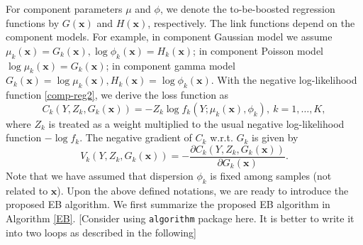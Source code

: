 \documentclass[11pt]{article}
\numberwithin{equation}{section}
\def\bx{\boldsymbol{x}}
\newcommand{\blue}[1]{\textcolor{blue}{#1}}
\begin{document}
For component parameters $\mu$ and $\phi$,  we denote the to-be-boosted regression functions by $G(\bx)$ and $H(\bx)$, respectively. 
The link functions depend on the component models.  For example, in component Gaussian model we assume $\mu_k(\bx)=G_k(\bx), \log \phi_k(\bx)=H_k(\bx)$; in component Poisson model $\log\mu_k(\bx)=G_k(\bx)$; in component gamma model $G_k(\bx)=\log \mu_k(\bx), H_k(\bx)=\log \phi_k(\bx).$
With the negative log-likelihood function \eqref{comp-reg2}, we derive the loss function as
	\begin{equation}\label{comp-loss}
		{C_k(Y,Z_k,G_k(\bx))}= -Z_k\log f_k(Y;\mu_k(\bx),\phi_k), ~ k=1,\ldots,K,
	\end{equation}
where $Z_k$ is treated as a weight multiplied to the usual negative log-likelihood function $-\log f_k$.
	The negative gradient of $C_k$ w.r.t. $G_k$ is given by 
\begin{equation}\label{comp-gradient}
{V_k(Y,Z_k,G_k(\bx))}=-\frac{\partial C_k(Y,Z_k,G_k(\bx))}{\partial G_k(\bx)}.
\end{equation}
Note that we have assumed that dispersion $\phi_k$ is fixed among samples (not related to $\bx$). 
Upon the above defined notations, we are ready to introduce the proposed EB algorithm.
We first summarize the proposed EB algorithm in Algorithm \ref{EB}.
{\color{blue}[Consider using {\tt algorithm} package here. It is better to write it into two loops as described in the following]}
\end{document}
